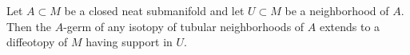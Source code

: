 Let $A \subset M$ be a closed neat submanifold and let $U \subset M$ be a neighborhood of $A$. Then the $A$-germ of any isotopy of tubular neighborhoods of $A$ extends to a diffeotopy of $M$ having support in $U$.
